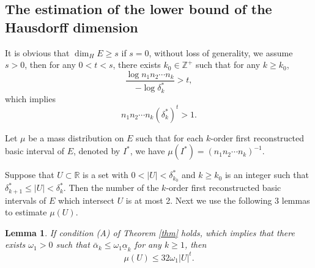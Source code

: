 \documentclass[reqno]{amsart}
\theoremstyle{plain}
\newtheorem{lem}{Lemma}
\theoremstyle{definition}
\theoremstyle{remark}
\numberwithin{equation}{section} \DeclareMathOperator\intr{int}
\begin{document}
\subsection{The estimation of  the lower bound of the Hausdorff dimension}

It is obvious that $\dim_{H}E\ge s$ if $s=0$, without loss of generality, we assume $s>0$, then for any $0<t<s$,  there exists $k_0 \in \mathbb{Z}^{+}$ such that for any $k\ge k_0$,
\begin{equation}
\frac{\log n_1n_2\cdots n_k}{-\log\delta^*_k}>t,\nonumber
\end{equation}
which implies
\begin{equation}\label{51}
n_1n_2\cdots n_k{(\delta^*_{k})}^t>1.
\end{equation}

Let $\mu$ be a mass distribution on $E$ such that for each $k$-order first reconstructed basic interval of $E$, denoted by $I^*$, we have $\mu(I^*)=(n_1n_2\cdots n_k)^{-1}$.

Suppose that $U\subset \mathbb{R}$ is a set with $0<\left | U \right | <\delta^*_{k_0}$ and $k\ge k_0$ is an integer such that $\delta^*_{k+1}\le \left | U \right | <\delta^*_k$. Then the number of the $k$-order first reconstructed  basic intervals of $E$ which intersect $U$ is at most 2. Next we use the following 3 lemmas to estimate  $\mu(U)$.

\begin{lem}\label{l3}
If condition {\rm(A)} of Theorem {\rm\ref{thm}} holds,
which implies that there exists $\omega_1>0$ such that $\bar{\alpha}_{k}\le \omega_1\underline{\alpha}_{k}$ for any $k\ge 1$, then
$$\mu(U)\le 32\omega_1\left | U \right |^t .$$
\end{lem}
\end{document}
